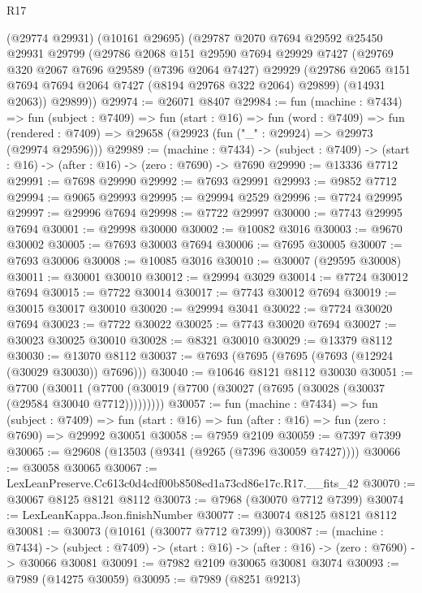 \begin{lexlean}{R17}
\begin{coremodule}
    (@29774 @29931)
    (@10161 @29695)
    (@29787
      @2070
      @7694
      @29592
      @25450
      @29931
      @29799
      (@29786
        @2068
        @151
        @29590
        @7694
        @29929
        @7427
        (@29769
          @320
          @2067
          @7696
          @29589
          (@7396 @2064 @7427)
          @29929
          (@29786 @2065 @151 @7694 @7694 @2064 @7427 (@8194 @29768 @322 @2064) @29899)
          (@14931 @2063))
        @29899))
@29974 := @26071 @8407
@29984 := fun (machine : @7434) =>
  fun (subject : @7409) =>
  fun (start : @16) =>
  fun (word : @7409) =>
  fun (rendered : @7409) => @29658 (@29923 (fun ("_" : @29924) => @29973 (@29974 @29596)))
@29989 := (machine : @7434) ->
  (subject : @7409) -> (start : @16) -> (after : @16) -> (zero : @7690) -> @7690
@29990 := @13336 @7712
@29991 := @7698 @29990
@29992 := @7693 @29991
@29993 := @9852 @7712
@29994 := @9065 @29993
@29995 := @29994 @2529
@29996 := @7724 @29995
@29997 := @29996 @7694
@29998 := @7722 @29997
@30000 := @7743 @29995 @7694
@30001 := @29998 @30000
@30002 := @10082 @3016
@30003 := @9670 @30002
@30005 := @7693 @30003 @7694
@30006 := @7695 @30005
@30007 := @7693 @30006
@30008 := @10085 @3016
@30010 := @30007 (@29595 @30008)
@30011 := @30001 @30010
@30012 := @29994 @3029
@30014 := @7724 @30012 @7694
@30015 := @7722 @30014
@30017 := @7743 @30012 @7694
@30019 := @30015 @30017 @30010
@30020 := @29994 @3041
@30022 := @7724 @30020 @7694
@30023 := @7722 @30022
@30025 := @7743 @30020 @7694
@30027 := @30023 @30025 @30010
@30028 := @8321 @30010
@30029 := @13379 @8112
@30030 := @13070 @8112
@30037 := @7693 (@7695 (@7695 (@7693 (@12924 (@30029 @30030)) @7696)))
@30040 := @10646 @8121 @8112 @30030
@30051 := @7700
    (@30011 (@7700 (@30019 (@7700 (@30027 (@7695 (@30028 (@30037 (@29584 @30040 @7712)))))))))
@30057 := fun (machine : @7434) =>
  fun (subject : @7409) =>
  fun (start : @16) => fun (after : @16) => fun (zero : @7690) => @29992 @30051
@30058 := @7959 @2109
@30059 := @7397 @7399
@30065 := @29608 (@13503 (@9341 (@9265 (@7396 @30059 @7427))))
@30066 := @30058 @30065
@30067 := LexLeanPreserve.Cc613c0d4cdf00b8508ed1a73cd86e17c.R17.__fits_42
@30070 := @30067 @8125 @8121 @8112
@30073 := @7968 (@30070 @7712 @7399)
@30074 := LexLeanKappa.Json.finishNumber
@30077 := @30074 @8125 @8121 @8112
@30081 := @30073 (@10161 (@30077 @7712 @7399))
@30087 := (machine : @7434) ->
  (subject : @7409) -> (start : @16) -> (after : @16) -> (zero : @7690) -> @30066 @30081
@30091 := @7982 @2109 @30065 @30081 @3074
@30093 := @7989 (@14275 @30059)
@30095 := @7989 (@8251 @9213)

\end{coremodule}
\end{lexlean}
